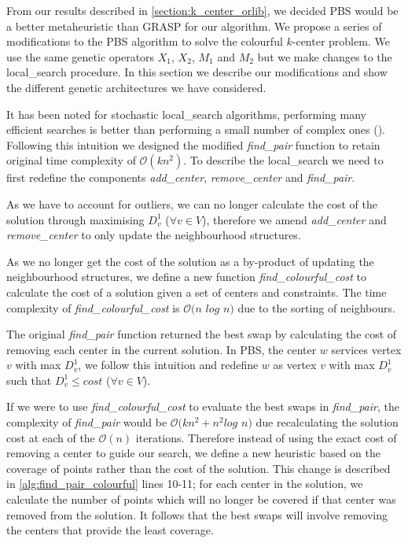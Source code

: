 From our results described in \cref{section:k_center_orlib}, we decided PBS would be a better metaheuristic than GRASP for our algorithm. We propose a series of modifications to the PBS algorithm to solve the colourful $k$-center problem. We use the same genetic operators $X_1$, $X_2$, $M_1$ and $M_2$ but we make changes to the \gls{local_search} procedure. In this section we describe our modifications and show the different genetic architectures we have considered.

It has been noted for stochastic \gls{local_search} algorithms, performing many efficient searches is better than performing a small number of complex ones (\cite{pullan_memetic_2008}). Following this intuition we designed the modified \emph{find\_pair} function to retain original time complexity of $\mathcal{O}(kn^2)$. To describe the \gls{local_search} we need to first redefine the components \emph{add\_center}, \emph{remove\_center} and \emph{find\_pair}.

As we have to account for outliers, we can no longer calculate the cost of the solution through maximising $D^1_v$ ($\forall v\in V$), therefore we amend \emph{add\_center} and \emph{remove\_center} to only update the neighbourhood structures.

\begin{minipage}{0.48\textwidth}
    
\end{minipage}
\hspace{0.02\textwidth}
\begin{minipage}{0.48\textwidth}
    
\end{minipage}

As we no longer get the cost of the solution as a by-product of updating the neighbourhood structures, we define a new function \emph{find\_colourful\_cost} to calculate the cost of a solution given a set of centers and constraints. The time complexity of \emph{find\_colourful\_cost} is $\mathcal{O}(n$ $log$ $n)$ due to the sorting of neighbours.


\newpage
The original \emph{find\_pair} function returned the best swap by calculating the cost of removing each center in the current solution. In PBS, the center $w$ services vertex $v$ with max $D^1_v$, we follow this intuition and redefine $w$ as vertex $v$ with max $D^1_v$ such that $D^1_v\leq cost$ ($\forall v\in V$). 

If we were to use \emph{find\_colourful\_cost} to evaluate the best swaps in \emph{find\_pair}, the complexity of \emph{find\_pair} would be $\mathcal{O}(kn^2+n^2log$ $n)$ due recalculating the solution cost at each of the $\mathcal{O}(n)$ iterations. Therefore instead of using the exact cost of removing a center to guide our search, we define a new heuristic based on the coverage of points rather than the cost of the solution. This change is described in \cref{alg:find_pair_colourful} lines 10-11; for each center in the solution, we calculate the number of points which will no longer be covered if that center was removed from the solution. It follows that the best swaps will involve removing the centers that provide the least coverage.

